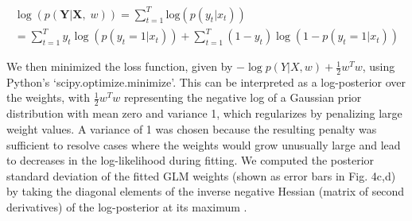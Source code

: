 \begin{equation}
\begin{array}{c}\log \left( {p\left( {{{{\mathbf{Y}}}}|{{{\mathbf{X}}}},\;w} \right)} \right) = \mathop {\sum }\limits_{t = 1}^T {{{\mathrm{log}}}}\left( {p\left( {y_t|x_t} \right)} \right)\\ = \mathop {\sum }\limits_{t = 1}^T y_t\log \left( {p\left( {y_t = 1|x_t} \right)} \right) + \mathop {\sum }\limits_{t = 1}^T \left( {1 - y_t} \right)\log \left( {1 - p\left( {y_t = 1|x_t} \right)} \right)\end{array}
\end{equation}

We then minimized the loss function, given by $- \log p\left( {Y{{{\mathrm{|}}}}X,w} \right) + \frac{1}{2}w^Tw$, using Python’s ‘scipy.optimize.minimize’. This can be interpreted as a log-posterior over the weights, with $\frac{1}{2}w^Tw$ representing the negative log of a Gaussian prior distribution with mean zero and variance 1, which regularizes by penalizing large weight values. A variance of 1 was chosen because the resulting penalty was sufficient to resolve cases where the weights would grow unusually large and lead to decreases in the log-likelihood during fitting. We computed the posterior standard deviation of the fitted GLM weights (shown as error bars in Fig. 4c,d) by taking the diagonal elements of the inverse negative Hessian (matrix of second derivatives) of the log-posterior at its maximum \cite{pillow_model-based_2011, bishop_pattern_2006}.